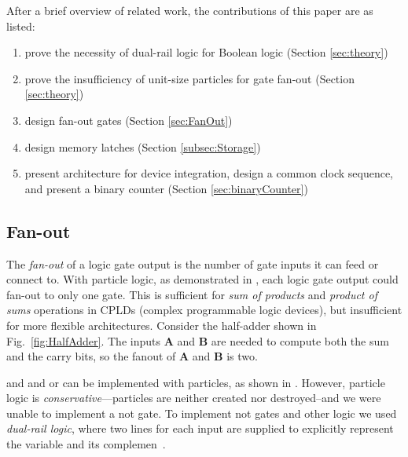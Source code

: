 \documentclass[letterpaper, 10 pt, conference]{ieeeconf}
\begin{document}
 After a brief overview of related work,  the contributions of this paper are as listed:
  \begin{enumerate}
  \item prove the necessity of dual-rail logic for Boolean logic (Section \ref{sec:theory})
  \item prove the insufficiency of unit-size particles for gate fan-out (Section \ref{sec:theory})
  \item design {\sc fan-out gates} (Section \ref{sec:FanOut})
  \item design memory latches (Section \ref{subsec:Storage})
  \item present architecture for device integration, design a common clock sequence, and present a binary counter (Section \ref{sec:binaryCounter})
    \end{enumerate}
  
  
  \subsection{Fan-out}
  
  The \emph{fan-out} of a logic gate output is the number of gate inputs it can feed or connect to.  With particle logic, as demonstrated in  \cite{Becker2014}, each logic gate output could fan-out to only one gate.  This is sufficient for \emph{sum of products} and \emph{product of sums}  operations in CPLDs (complex programmable logic devices), but insufficient for more flexible architectures.
%  
    Consider the half-adder shown in Fig.~\ref{fig:HalfAdder}.  The inputs $\mathbf{A}$ and  $\mathbf{B}$ are needed to compute both the {\sc sum} and the {\sc carry} bits, so the fanout of $\mathbf{A}$ and  $\mathbf{B}$ is two.
  
  
{\sc and} and {\sc or} can be implemented with particles, as shown in \cite{Becker2013f}.  However, particle logic is \emph{conservative}---particles are neither created nor destroyed--and we were unable to implement a {\sc not} gate. To implement {\sc not} gates and other logic we used \emph{dual-rail logic}, where two lines for each input are supplied to explicitly represent the variable and its complemen~\cite{Becker2014a}. 
\end{document}
